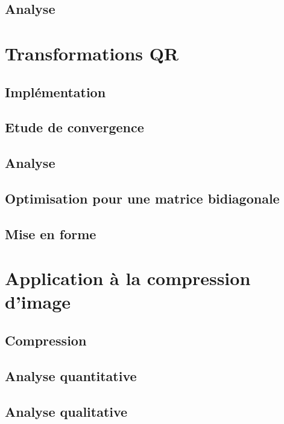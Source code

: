 \documentclass{article}
\begin{document}
\subsection{Analyse}
\label{ssec:analyse_bidiag}


\section{Transformations QR}
\label{sec:transfo_qr}

\subsection{Implémentation}
\label{ssec:implem_qr}

\subsection{Etude de convergence}
\label{ssec:conv_qr}

\subsection{Analyse}
\label{ssec:analyse_qr}

\subsection{Optimisation pour une matrice bidiagonale}
\label{ssec:opti_bidiag_qr}

\subsection{Mise en forme}
\label{ssec:mise_en_forme_qr}


\section{Application à la compression d'image}
\label{sec:appli_compr_img}

\subsection{Compression}
\label{ssec:compr_img}

\subsection{Analyse quantitative}
\label{ssec:quanti_img}

\subsection{Analyse qualitative}
\label{ssec:quali_img}
\end{document}
